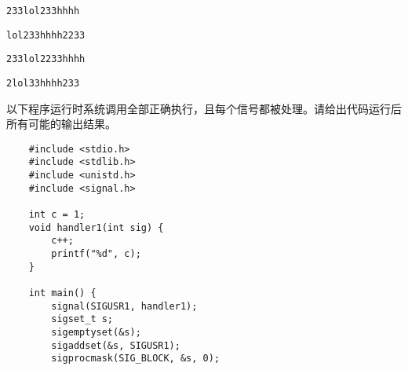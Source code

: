 \begin{problems}
        \begin{choices}
            \item \verb|233lol233hhhh|
            \item \verb|lol233hhhh2233|
            \item \verb|233lol2233hhhh|
            \item \verb|2lol33hhhh233|
        \end{choices}
         以下程序运行时系统调用全部正确执行，且每个信号都被处理。请给出代码运行后所有可能的输出结果。
        \begin{verbatim}
    #include <stdio.h>
    #include <stdlib.h>
    #include <unistd.h>
    #include <signal.h>

    int c = 1;
    void handler1(int sig) {
        c++;
        printf("%d", c);
    }

    int main() {
        signal(SIGUSR1, handler1);
        sigset_t s;
        sigemptyset(&s);
        sigaddset(&s, SIGUSR1);
        sigprocmask(SIG_BLOCK, &s, 0);


\end{verbatim}
\end{problems}
